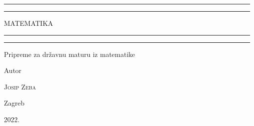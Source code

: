 \documentclass[a4paper,12pt,oneside,draft]{book}
\begin{document}
\begin{titlepage}

	\centering
	\scshape
	\vspace*{\baselineskip}


	\rule{\textwidth}{1.6pt}\vspace*{-\baselineskip}\vspace*{2pt}
	\rule{\textwidth}{0.4pt}

	\vspace{0.75\baselineskip}

	{\LARGE MATEMATIKA\\}

	\vspace{0.75\baselineskip}

	\rule{\textwidth}{0.4pt}\vspace*{-\baselineskip}\vspace{3.2pt}
	\rule{\textwidth}{1.6pt}

	\vspace{2\baselineskip}


	Pripreme za državnu maturu iz matematike

	\vspace*{3\baselineskip}


	Autor

	\vspace{0.5\baselineskip}
	{\scshape\Large Josip Zeba\\}

	\vfill


	\vspace{0.3\baselineskip}
	Zagreb

	2022.

\end{titlepage}

\setcounter{tocdepth}{1}
\clearpage
\ifpdf
\fi
{}
\tableofcontents

\clearpage




\end{document}
